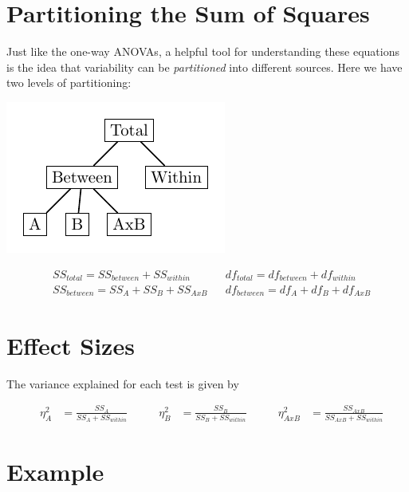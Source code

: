 \documentclass{tufte-handout}
\begin{document}
\section{Partitioning the Sum of Squares}
Just like the one-way ANOVAs, a helpful tool for understanding these equations is the idea that variability can be \emph{partitioned} into different sources. Here we have two levels of partitioning:
\begin{marginfigure}%
  \includegraphics[width=\linewidth]{images/anova_partition_two_way}%
  \label{fig:fullfig}%
\end{marginfigure}

\begin{align*}
&SS_{total}=SS_{between}+SS_{within} 	&	&df_{total}=df_{between}+df_{within}\\
&SS_{between}=SS_{A}+SS_{B}+SS_{AxB} 	&	&df_{between}=df_{A}+df_{B}+df_{AxB}
\end{align*}

\section{Effect Sizes}
The variance explained for each test is given by

\begin{align*}
&\eta^2_A&=\frac{SS_A}{SS_A+SS_{within}} 	\qquad
&\eta^2_B&=\frac{SS_B}{SS_B+SS_{within}} 	\qquad
&\eta^2_{AxB}&=\frac{SS_{AxB}}{SS_{AxB}+SS_{within}}
\end{align*}


\section{Example}
\end{document}
